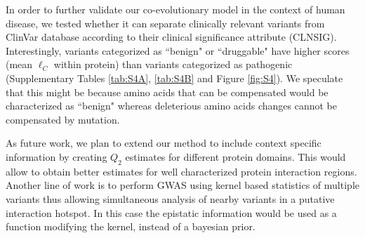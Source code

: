 In order to further validate our co-evolutionary model in the context of human disease, we tested whether it can separate clinically relevant variants from ClinVar database \cite{landrum2013clinvar} according to their clinical significance attribute (CLNSIG). Interestingly, variants categorized as ``benign" or ``druggable" have higher scores (mean $\ell_C$ within protein) than variants categorized as pathogenic (Supplementary Tables \ref{tab:S4A}, \ref{tab:S4B} and Figure \ref{fig:S4}). We speculate that this might be because amino acids that can be compensated would be characterized as ``benign" whereas deleterious amino acids changes cannot be compensated by mutation. 

As future work, we plan to extend our method to include context specific information by creating $Q_2$ estimates for different protein domains. This would allow to obtain better estimates for well characterized protein interaction regions. Another line of work is to perform GWAS using kernel based statistics of multiple variants \cite{wu2011rare} thus allowing simultaneous analysis of nearby variants in a putative interaction hotspot. In this case the epistatic information would be used as a function modifying the kernel, instead of a bayesian prior.
